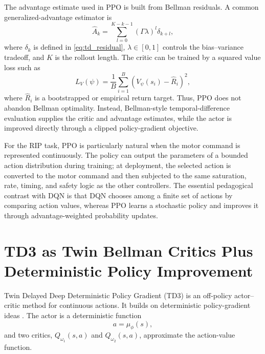 \documentclass[11pt]{article}
\begin{document}
The advantage estimate used in PPO is built from Bellman residuals. A common generalized-advantage estimator is
\begin{equation}
\widehat{A}_k
=
\sum_{l=0}^{K-k-1}
(\Gamma\lambda)^l\delta_{k+l},
\label{eq:gae}
\end{equation}
where $\delta_k$ is defined in \eqref{eq:td_residual}, $\lambda\in[0,1]$ controls the bias--variance tradeoff, and $K$ is the rollout length. The critic can be trained by a squared value loss such as
\begin{equation}
L_V(\psi)
=
\frac{1}{B}\sum_{i=1}^{B}
\left(V_{\psi}(s_i)-\widehat{R}_i\right)^2,
\label{eq:ppo_value_loss}
\end{equation}
where $\widehat{R}_i$ is a bootstrapped or empirical return target. Thus, PPO does not abandon Bellman optimality. Instead, Bellman-style temporal-difference evaluation supplies the critic and advantage estimates, while the actor is improved directly through a clipped policy-gradient objective.

For the RIP task, PPO is particularly natural when the motor command is represented continuously. The policy can output the parameters of a bounded action distribution during training; at deployment, the selected action is converted to the motor command and then subjected to the same saturation, rate, timing, and safety logic as the other controllers. The essential pedagogical contrast with DQN is that DQN chooses among a finite set of actions by comparing action values, whereas PPO learns a stochastic policy and improves it through advantage-weighted probability updates.

\section{TD3 as Twin Bellman Critics Plus Deterministic Policy Improvement}

Twin Delayed Deep Deterministic Policy Gradient (TD3) \cite{fujimoto2018td3} is an off-policy actor--critic method for continuous actions. It builds on deterministic policy-gradient ideas \cite{silver2014dpg}. The actor is a deterministic function
\begin{equation}
a=\mu_{\phi}(s),
\label{eq:td3_actor}
\end{equation}
and two critics, $Q_{\omega_1}(s,a)$ and $Q_{\omega_2}(s,a)$, approximate the action-value function.
\end{document}
